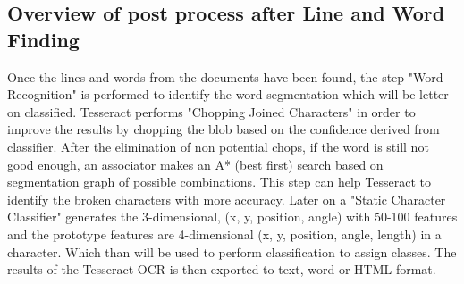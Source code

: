 \subsection{Overview of post process after Line and Word Finding}

Once the lines and words from the documents have been found, the step "Word Recognition" \cite{AnOverviewoftheTesseractOCREngine} is performed to identify the word segmentation which will be letter on classified. Tesseract performs "Chopping Joined Characters" in order to improve the results by chopping the blob based on the confidence derived from classifier. After the elimination of non potential chops, if the word is still not good enough, an associator makes an A* (best first) search based on  segmentation graph of possible combinations. This step can help Tesseract to identify the broken characters with more accuracy. Later on a "Static Character Classifier" \cite{AnOverviewoftheTesseractOCREngine} generates the 3-dimensional, (x, y, position, angle) with 50-100 features and the prototype features are 4-dimensional (x, y, position, angle, length) in a character. Which than will be used to perform classification to assign classes. The results of the Tesseract OCR is then exported to text, word or HTML format.